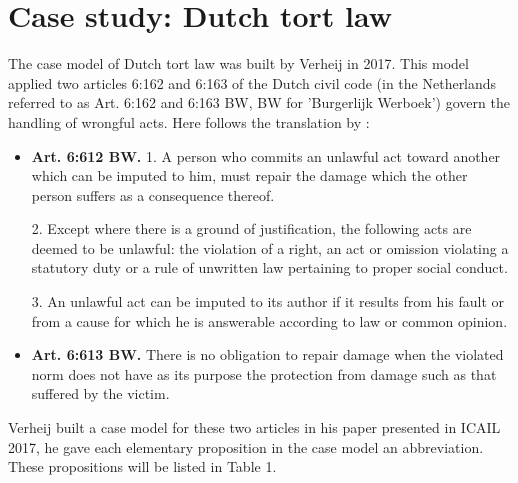 \documentclass{IOS-Book-Article}
\begin{document}
\section{Case study: Dutch tort law}




\noindent The case model of Dutch tort law was built by Verheij in 2017\citep{Verheij2017Formalizing}. This model applied two articles 6:162 and 6:163 of the Dutch civil code (in the Netherlands referred to as Art. 6:162 and 6:163 BW, BW for 'Burgerlijk Werboek') govern the handling of wrongful acts. Here follows the translation by \citep{Betlem1993Civil}:

\begin{itemize}
\item \textbf{Art. 6:612 BW.} 1. A person who commits an unlawful act toward another which can be imputed to him, must repair the damage which the other person suffers as a consequence thereof.

2. Except where there is a ground of justification, the following acts are deemed to be unlawful: the violation of a right, an act or omission violating a statutory duty or a rule of unwritten law pertaining to proper social conduct.

3. An unlawful act can be imputed to its author if it results from his fault or from a cause for which he is answerable according to law or common opinion.

\item \textbf{Art. 6:613 BW.} There is no obligation to repair damage when the violated norm does not have as its purpose the protection from damage such as that suffered by the victim.
\end{itemize}

Verheij built a case model for these two articles in his paper presented in ICAIL 2017\citep{Verheij2017Formalizing}, he gave each elementary proposition in the case model an abbreviation. These propositions will be listed in Table 1.
\end{document}
